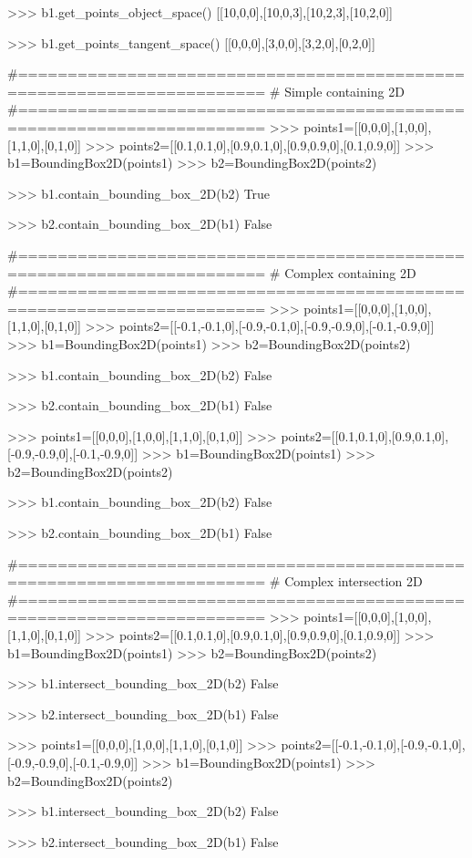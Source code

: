 \begin{DoxyVerb}
>>> b1.get_points_object_space()
[[10,0,0],[10,0,3],[10,2,3],[10,2,0]]

>>> b1.get_points_tangent_space()
[[0,0,0],[3,0,0],[3,2,0],[0,2,0]]

#=======================================================================
# Simple containing 2D
#=======================================================================
>>> points1=[[0,0,0],[1,0,0],[1,1,0],[0,1,0]]
>>> points2=[[0.1,0.1,0],[0.9,0.1,0],[0.9,0.9,0],[0.1,0.9,0]]
>>> b1=BoundingBox2D(points1)
>>> b2=BoundingBox2D(points2)

>>> b1.contain_bounding_box_2D(b2)
True

>>> b2.contain_bounding_box_2D(b1)
False

#=======================================================================
# Complex containing 2D
#=======================================================================
>>> points1=[[0,0,0],[1,0,0],[1,1,0],[0,1,0]]
>>> points2=[[-0.1,-0.1,0],[-0.9,-0.1,0],[-0.9,-0.9,0],[-0.1,-0.9,0]]
>>> b1=BoundingBox2D(points1)
>>> b2=BoundingBox2D(points2)

>>> b1.contain_bounding_box_2D(b2)
False

>>> b2.contain_bounding_box_2D(b1)
False

>>> points1=[[0,0,0],[1,0,0],[1,1,0],[0,1,0]]
>>> points2=[[0.1,0.1,0],[0.9,0.1,0],[-0.9,-0.9,0],[-0.1,-0.9,0]]
>>> b1=BoundingBox2D(points1)
>>> b2=BoundingBox2D(points2)

>>> b1.contain_bounding_box_2D(b2)
False

>>> b2.contain_bounding_box_2D(b1)
False

#=======================================================================
# Complex intersection 2D
#=======================================================================
>>> points1=[[0,0,0],[1,0,0],[1,1,0],[0,1,0]]
>>> points2=[[0.1,0.1,0],[0.9,0.1,0],[0.9,0.9,0],[0.1,0.9,0]]
>>> b1=BoundingBox2D(points1)
>>> b2=BoundingBox2D(points2)

>>> b1.intersect_bounding_box_2D(b2)
False

>>> b2.intersect_bounding_box_2D(b1)
False

>>> points1=[[0,0,0],[1,0,0],[1,1,0],[0,1,0]]
>>> points2=[[-0.1,-0.1,0],[-0.9,-0.1,0],[-0.9,-0.9,0],[-0.1,-0.9,0]]
>>> b1=BoundingBox2D(points1)
>>> b2=BoundingBox2D(points2)

>>> b1.intersect_bounding_box_2D(b2)
False

>>> b2.intersect_bounding_box_2D(b1)
False


\end{DoxyVerb}
